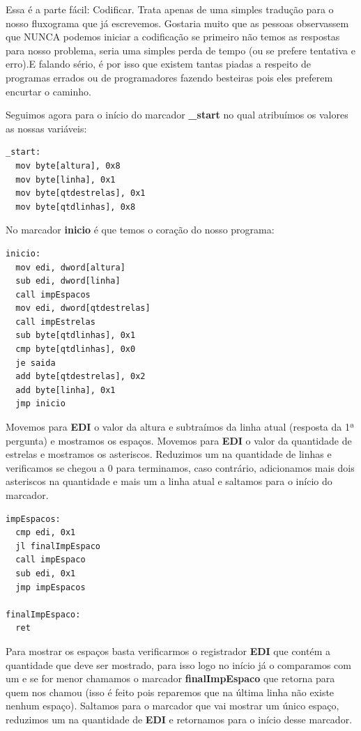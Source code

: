 Essa é a parte fácil: Codificar. Trata apenas de uma simples tradução para o nosso fluxograma que já escrevemos. Gostaria muito que as pessoas observassem que NUNCA podemos iniciar a codificação se primeiro não temos as respostas para nosso problema, seria uma simples perda de tempo (ou se prefere tentativa e erro).E falando sério, é por isso que existem tantas piadas a respeito de programas errados ou de programadores fazendo besteiras pois eles preferem encurtar o caminho.

Seguimos agora para o início do marcador \textbf{\_start} no qual atribuímos os valores as nossas variáveis:
\begin{lstlisting}[]
_start:
  mov byte[altura], 0x8
  mov byte[linha], 0x1
  mov byte[qtdestrelas], 0x1
  mov byte[qtdlinhas], 0x8
\end{lstlisting}

No marcador \textbf{inicio} é que temos o coração do nosso programa:
\begin{lstlisting}[]
inicio:
  mov edi, dword[altura]
  sub edi, dword[linha]
  call impEspacos
  mov edi, dword[qtdestrelas]
  call impEstrelas
  sub byte[qtdlinhas], 0x1
  cmp byte[qtdlinhas], 0x0
  je saida
  add byte[qtdestrelas], 0x2
  add byte[linha], 0x1
  jmp inicio	
\end{lstlisting}

Movemos para \textbf{EDI} o valor da altura e subtraímos da linha atual (resposta da 1ª pergunta) e mostramos os espaços. Movemos para \textbf{EDI} o valor da quantidade de estrelas e mostramos os asteriscos. Reduzimos um na quantidade de linhas e verificamos se chegou a 0 para terminamos, caso contrário, adicionamos mais dois asteriscos na quantidade e mais um a linha atual e saltamos para o início do marcador.

\begin{lstlisting}[]
impEspacos:
  cmp edi, 0x1
  jl finalImpEspaco
  call impEspaco
  sub edi, 0x1
  jmp impEspacos
  
finalImpEspaco:
  ret  	
\end{lstlisting}

Para mostrar os espaços basta verificarmos o registrador \textbf{EDI} que contém a quantidade que deve ser mostrado, para isso logo no início já o comparamos com um e se for menor chamamos o marcador \textbf{finalImpEspaco} que retorna para quem nos chamou (isso é feito pois reparemos que na última linha não existe nenhum espaço). Saltamos para o marcador que vai mostrar um único espaço, reduzimos um na quantidade de \textbf{EDI} e retornamos para o início desse marcador.


